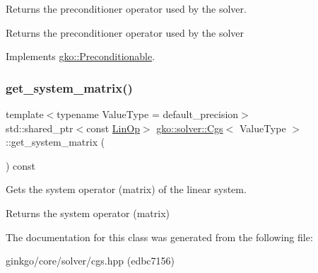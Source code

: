 Returns the preconditioner operator used by the solver. 

\begin{DoxyReturn}{Returns}
the preconditioner operator used by the solver 
\end{DoxyReturn}


Implements \hyperlink{classgko_1_1Preconditionable_ad9545089aef0dfc83bc7a74e5bf1d748}{gko\+::\+Preconditionable}.

\mbox{\label{classgko_1_1solver_1_1Cgs_aa537b2e6b7ccf95e96b4100866da1770}} 
\subsubsection{\texorpdfstring{get\+\_\+system\+\_\+matrix()}{get\_system\_matrix()}}
{\footnotesize\ttfamily template$<$typename Value\+Type  = default\+\_\+precision$>$ \\
std\+::shared\+\_\+ptr$<$const \hyperlink{classgko_1_1LinOp}{Lin\+Op}$>$ \hyperlink{classgko_1_1solver_1_1Cgs}{gko\+::solver\+::\+Cgs}$<$ Value\+Type $>$\+::get\+\_\+system\+\_\+matrix (\begin{DoxyParamCaption}{ }\end{DoxyParamCaption}) const\hspace{0.3cm}{\ttfamily [inline]}}



Gets the system operator (matrix) of the linear system. 

\begin{DoxyReturn}{Returns}
the system operator (matrix) 
\end{DoxyReturn}


The documentation for this class was generated from the following file\+:\begin{DoxyCompactItemize}
\item 
ginkgo/core/solver/cgs.\+hpp (edbc7156)\end{DoxyCompactItemize}
